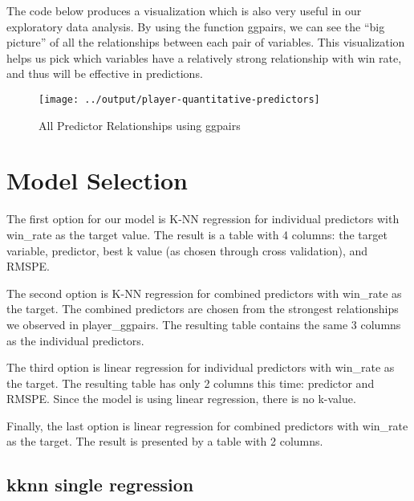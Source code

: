 \documentclass[
]{article}
\begin{document}
The code below produces a visualization which is also very useful in our exploratory data analysis. By using the function ggpairs, we can see the ``big picture'' of all the relationships between each pair of variables. This visualization helps us pick which variables have a relatively strong relationship with win rate, and thus will be effective in predictions.

\begin{figure}
\texttt{[image: ../output/player-quantitative-predictors]} \caption{All Predictor Relationships using ggpairs}\label{fig:unnamed-chunk-2}
\end{figure}

\hypertarget{model-selection}{%
\section{Model Selection}\label{model-selection}}

The first option for our model is K-NN regression for individual predictors with win\_rate as the target value. The result is a table with 4 columns: the target variable, predictor, best k value (as chosen through cross validation), and RMSPE.

The second option is K-NN regression for combined predictors with win\_rate as the target. The combined predictors are chosen from the strongest relationships we observed in player\_ggpairs. The resulting table contains the same 3 columns as the individual predictors.

The third option is linear regression for individual predictors with win\_rate as the target. The resulting table has only 2 columns this time: predictor and RMSPE. Since the model is using linear regression, there is no k-value.

Finally, the last option is linear regression for combined predictors with win\_rate as the target. The result is presented by a table with 2 columns.

\hypertarget{kknn-single-regression}{%
\subsection{kknn single regression}\label{kknn-single-regression}}
\end{document}
